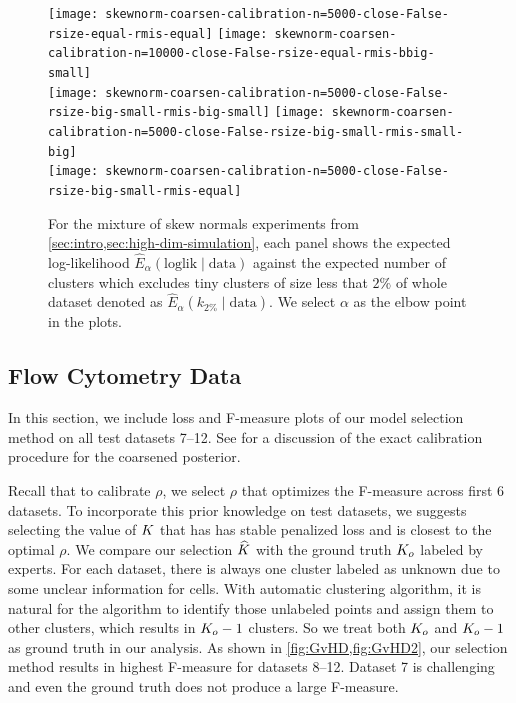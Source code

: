 \begin{figure}[tp]
	\centering
	\texttt{[image: skewnorm-coarsen-calibration-n=5000-close-False-rsize-equal-rmis-equal]}
	\texttt{[image: skewnorm-coarsen-calibration-n=10000-close-False-rsize-equal-rmis-bbig-small]}\\
	\texttt{[image: skewnorm-coarsen-calibration-n=5000-close-False-rsize-big-small-rmis-big-small]}
	\texttt{[image: skewnorm-coarsen-calibration-n=5000-close-False-rsize-big-small-rmis-small-big]}\\
	\texttt{[image: skewnorm-coarsen-calibration-n=5000-close-False-rsize-big-small-rmis-equal]}
	\caption{For the mixture of skew normals experiments from \cref{sec:intro,sec:high-dim-simulation}, each panel shows the expected log-likelihood $\widehat{E}_{\alpha}(\mathrm{loglik}\mid \mathrm{data})$ against the expected number of clusters which excludes tiny clusters of size less that $2\%$ of whole dataset denoted as $\widehat{E}_{\alpha}(k_{2\%}\mid \mathrm{data})$.
		We select $\alpha$ as the elbow point in the plots.}
	\label{fig:coarsen-calibration}
\end{figure}

\subsection{Flow Cytometry Data}
\label{appx:flow-cytometry}

In this section, we include loss and F-measure plots of our model selection method on all test datasets 7--12.
See \citet[Section 5.2]{Miller:2019} for a discussion of the exact calibration procedure for the coarsened posterior.

Recall that to calibrate $\rho$, we select $\rho$ that optimizes the F-measure across first $6$ datasets.
To incorporate this prior knowledge on test datasets, we suggests selecting the value of $K$
that has has stable penalized loss and is closest to the optimal $\rho$.
We compare our selection $\widehat{K}$ with the ground truth $K_o$ labeled by experts.
For each dataset, there is always one cluster labeled as unknown due to some unclear information for cells.
With automatic clustering algorithm, it is natural for the algorithm to identify those unlabeled points and assign them to other clusters, which results in $K_o-1$ clusters.
So we treat both $K_o$ and $K_o-1$ as ground truth in our analysis.
As shown in \cref{fig:GvHD,fig:GvHD2}, our selection method results in highest F-measure for datasets 8--12.
Dataset 7 is challenging and even the ground truth does not produce a large F-measure.




